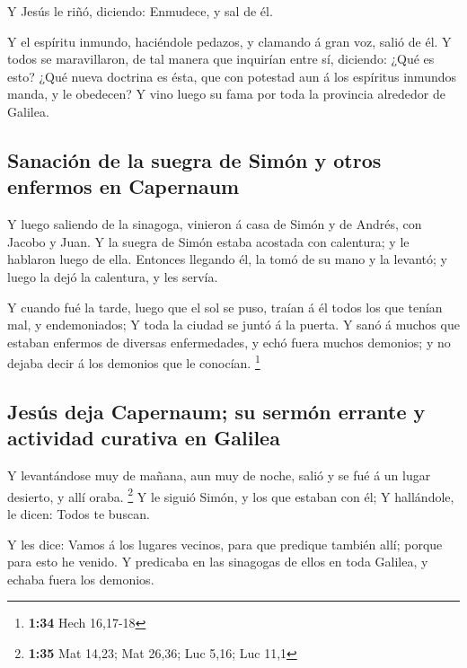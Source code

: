  Y Jesús le riñó, diciendo: Enmudece, y sal de él.

 Y el espíritu inmundo, haciéndole pedazos, y clamando á
gran voz, salió de él.  Y todos se maravillaron, de tal
manera que inquirían entre sí, diciendo: ¿Qué es esto? ¿Qué nueva
doctrina es ésta, que con potestad aun á los espíritus inmundos manda, y
le obedecen?  Y vino luego su fama por toda la provincia
alrededor de Galilea.

\hypertarget{sanaciuxf3n-de-la-suegra-de-simuxf3n-y-otros-enfermos-en-capernaum}{%
\subsection{Sanación de la suegra de Simón y otros enfermos en
Capernaum}\label{sanaciuxf3n-de-la-suegra-de-simuxf3n-y-otros-enfermos-en-capernaum}}

 Y luego saliendo de la sinagoga, vinieron á casa de Simón
y de Andrés, con Jacobo y Juan.  Y la suegra de Simón
estaba acostada con calentura; y le hablaron luego de ella.
 Entonces llegando él, la tomó de su mano y la levantó; y
luego la dejó la calentura, y les servía.

 Y cuando fué la tarde, luego que el sol se puso, traían á
él todos los que tenían mal, y endemoniados;  Y toda la
ciudad se juntó á la puerta.  Y sanó á muchos que estaban
enfermos de diversas enfermedades, y echó fuera muchos demonios; y no
dejaba decir á los demonios que le conocían. \footnote{\textbf{1:34}
  Hech 16,17-18}

\hypertarget{jesuxfas-deja-capernaum-su-sermuxf3n-errante-y-actividad-curativa-en-galilea}{%
\subsection{Jesús deja Capernaum; su sermón errante y actividad curativa
en
Galilea}\label{jesuxfas-deja-capernaum-su-sermuxf3n-errante-y-actividad-curativa-en-galilea}}

 Y levantándose muy de mañana, aun muy de noche, salió y se
fué á un lugar desierto, y allí oraba. \footnote{\textbf{1:35} Mat
  14,23; Mat 26,36; Luc 5,16; Luc 11,1}  Y le siguió Simón,
y los que estaban con él;  Y hallándole, le dicen: Todos te
buscan.

 Y les dice: Vamos á los lugares vecinos, para que predique
también allí; porque para esto he venido.  Y predicaba en
las sinagogas de ellos en toda Galilea, y echaba fuera los demonios.

